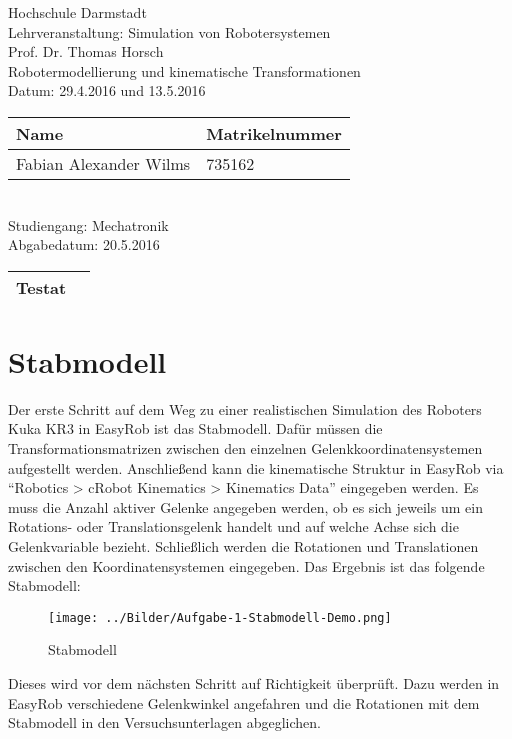 \documentclass[11pt, a4paper]{article}
\date{\today}
\begin{document}
\begin{center}
{\Huge Hochschule Darmstadt} \\
\vspace{0.5cm}
Lehrveranstaltung: Simulation von Robotersystemen \\
Prof. Dr. Thomas Horsch \\
Robotermodellierung und kinematische Transformationen\\
Datum: 29.4.2016 und 13.5.2016 \\
\vfill
\renewcommand{\arraystretch}{2}
	\begin{tabular}{| l | l |}
	\hline
	Name & Matrikelnummer \\ \hline
	Fabian Alexander Wilms & 735162 \\ \hline
	\end{tabular} \\
\vspace{0.5cm}
Studiengang: Mechatronik \\
Abgabedatum: 20.5.2016 \\
\vspace{0.5cm}
\begin{tabular}{| l | p{5cm} |}
	\hline
	Testat & \\ \hline
\end{tabular}
\renewcommand{\arraystretch}{1}
\end{center}
\newpage
\tableofcontents
\newpage
\section{Stabmodell}
Der erste Schritt auf dem Weg zu einer realistischen Simulation des Roboters Kuka KR3 in EasyRob ist das Stabmodell. Dafür müssen die Transformationsmatrizen zwischen den einzelnen Gelenkkoordinatensystemen aufgestellt werden. Anschließend kann die kinematische Struktur in EasyRob via \enquote{Robotics > cRobot Kinematics > Kinematics Data} eingegeben werden. Es muss die Anzahl aktiver Gelenke angegeben werden, ob es sich jeweils um ein Rotations- oder Translationsgelenk handelt und auf welche Achse sich die Gelenkvariable bezieht. Schließlich werden die Rotationen und Translationen zwischen den Koordinatensystemen eingegeben. Das Ergebnis ist das folgende Stabmodell:
\begin{figure}[H]
\texttt{[image: ../Bilder/Aufgabe-1-Stabmodell-Demo.png]}
\caption{Stabmodell}
\end{figure}
Dieses wird vor dem nächsten Schritt auf Richtigkeit überprüft. Dazu werden in EasyRob verschiedene Gelenkwinkel angefahren und die Rotationen mit dem Stabmodell in den Versuchsunterlagen abgeglichen.
\end{document}
